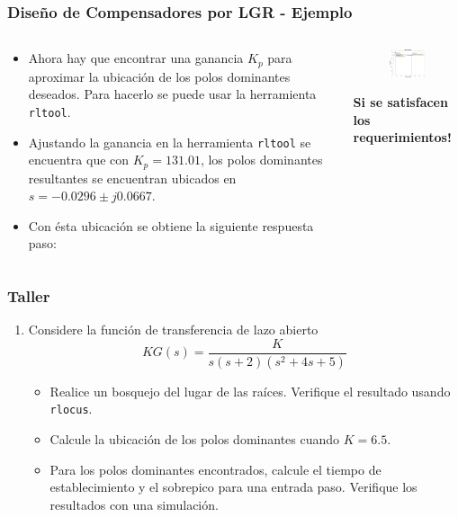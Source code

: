 \documentclass[aspectratio=169,handout]{beamer}
\theoremstyle{definition}
\theoremstyle{plain}
\theoremstyle{remark}
\newcounter{saveenumi}
\newcommand{\seti}{\setcounter{saveenumi}{\value{enumi}}}
\begin{document}
\begin{frame}[c]\frametitle{Diseño de Compensadores por LGR - Ejemplo}
\begin{columns}
	\begin{column}{0.5\textwidth}
	\small
	\begin{itemize}
		\item Ahora hay que encontrar una ganancia $K_p$ para aproximar la ubicación de los polos dominantes deseados. Para hacerlo se puede usar la herramienta \texttt{rltool}.
		\item Ajustando la ganancia en la herramienta \texttt{rltool} se encuentra que con $K_p = 131.01$, los polos dominantes resultantes se encuentran ubicados en $s = -0.0296 \pm j0.0667$.
		\item Con ésta ubicación se obtiene la siguiente respuesta paso:
	\end{itemize}	
	\end{column}
	\begin{column}{0.5\textwidth}
	\small
	\begin{figure}
		\includegraphics[width=7cm]{images/LGR_examaple_step.eps}
	\end{figure}
	\centering
	\textbf{Si se satisfacen los requerimientos!}
	\end{column}
\end{columns}
\end{frame}

\begin{frame}[c]\frametitle{Taller}
\begin{enumerate}
	\item Considere la función de transferencia de lazo abierto
	\begin{equation*}
		KG(s) = \frac{K}{s(s+2)(s^2+4s+5)}
	\end{equation*}
	\begin{itemize}
		\item Realice un bosquejo del lugar de las raíces. Verifique el resultado usando \texttt{rlocus}.
		\item Calcule la ubicación de los polos dominantes cuando $K = 6.5$.
		\item Para los polos dominantes encontrados, calcule el tiempo de establecimiento y el sobrepico para una entrada paso. Verifique los resultados con una simulación.
	\end{itemize}
	\seti
\end{enumerate}
\end{frame}
\end{document}
